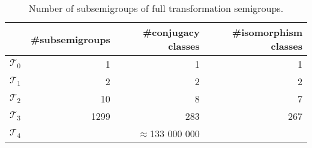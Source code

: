 \documentclass{amsart}
\newcommand{\cT}{{\mathcal T}}
\theoremstyle{plain}
\theoremstyle{definition}
\begin{document}
\begin{table}
\renewcommand{\arraystretch}{1}
\begin{tabular}{|c|r|r|r|}
\hline
 & \#subsemigroups & \#conjugacy classes & \#isomorphism classes \\
\hline
$\cT_0$ & 1  & 1 & 1\\
\hline
$\cT_1$ & 2  & 2 & 2\\
\hline
$\cT_2$ & 10  & 8 & 7\\
\hline
$\cT_3$ & 1299 & 283 & 267\\
\hline
$\cT_4$ & &$\approx$133 000 000 & \\
\hline
\end{tabular}
\caption{Number of subsemigroups of full transformation semigroups.}
\end{table}



\end{document}
